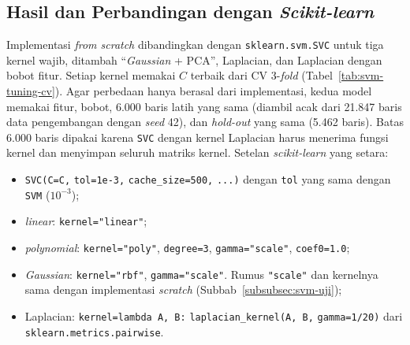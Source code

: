 \subsection{Hasil dan Perbandingan dengan \textit{Scikit-learn}}
\label{subsec:svm-hasil}

Implementasi \textit{from scratch} dibandingkan dengan \texttt{sklearn.svm.SVC} \cite{pedregosa2011sklearn} untuk tiga kernel wajib, ditambah ``\textit{Gaussian} + PCA'', Laplacian, dan Laplacian dengan bobot fitur. Setiap kernel memakai $C$ terbaik dari CV 3-\textit{fold} (Tabel~\ref{tab:svm-tuning-cv}). Agar perbedaan hanya berasal dari implementasi, kedua model memakai fitur, bobot, 6.000 baris latih yang sama (diambil acak dari 21.847 baris data pengembangan dengan \textit{seed} 42), dan \textit{hold-out} yang sama (5.462 baris). Batas 6.000 baris dipakai karena \texttt{SVC} dengan kernel Laplacian harus menerima fungsi kernel dan menyimpan seluruh matriks kernel. Setelan \textit{scikit-learn} yang setara:
\begin{itemize}
	\item \texttt{SVC(C=C,} \texttt{tol=1e-3,} \texttt{cache\_size=500,} \texttt{...)} dengan \texttt{tol} yang sama dengan \texttt{SVM} ($10^{-3}$);
	\item \textit{linear}: \texttt{kernel="linear"};
	\item \textit{polynomial}: \texttt{kernel="poly"}, \texttt{degree=3}, \texttt{gamma="scale"}, \texttt{coef0=1.0};
	\item \textit{Gaussian}: \texttt{kernel="rbf"}, \texttt{gamma="scale"}. Rumus \texttt{"scale"} dan kernelnya sama dengan implementasi \textit{scratch} (Subbab~\ref{subsubsec:svm-uji});
	\item Laplacian: \texttt{kernel=lambda A, B:} \texttt{laplacian\_kernel(A, B,} \texttt{gamma=1/20)} dari \nolinkurl{sklearn.metrics.pairwise}.
\end{itemize}

